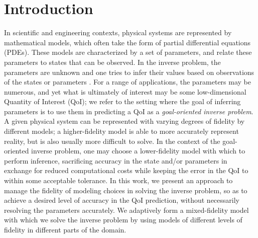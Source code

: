 \section{Introduction}

In scientific and engineering contexts, physical systems are represented by mathematical models, which often take the form of partial differential equations (PDEs). These models are characterized by a set of parameters, and relate these parameters to states that can be observed. In the inverse problem, the parameters are unknown and one tries to infer their values based on observations of the states or parameters \cite{Taran05, BanksKuhn89}. For a range of applications, the parameters may be numerous, and yet what is ultimately of interest may be some low-dimensional Quantity of Interest (QoI); we refer to the setting where the goal of inferring parameters is to use them in predicting a QoI as a \textit{goal-oriented inverse problem}. A given physical system can be represented with varying degrees of fidelity by different models; a higher-fidelity model is able to more accurately represent reality, but is also usually more difficult to solve. In the context of the goal-oriented inverse problem, one may choose a lower-fidelity model with which to perform inference, sacrificing accuracy in the state and/or parameters in exchange for reduced computational costs while keeping the error in the QoI to within some acceptable tolerance. In this work, we present an approach to manage the fidelity of modeling choices in solving the inverse problem, so as to achieve a desired level of accuracy in the QoI prediction, without necessarily resolving the parameters accurately. We adaptively form a mixed-fidelity model with which we solve the inverse problem by using models of different levels of fidelity in different parts of the domain.



